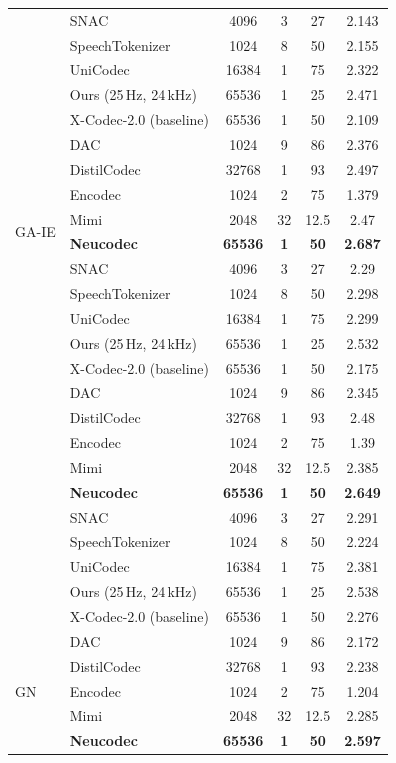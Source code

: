 \documentclass[preprint]{article}
\begin{document}
\begin{longtable}{llcccc}
  & SNAC & 4096 & 3 & 27 & 2.143 \\
  & SpeechTokenizer & 1024 & 8 & 50 & 2.155 \\
  & UniCodec & 16384 & 1 & 75 & 2.322 \\
  & Ours (25\,Hz, 24\,kHz) & 65536 & 1 & 25 & 2.471 \\
  & X-Codec-2.0 (baseline) & 65536 & 1 & 50 & 2.109 \\
\midrule
\multirow{8}{*}{GA-IE}
  & DAC & 1024 & 9 & 86 & 2.376 \\
  & DistilCodec & 32768 & 1 & 93 & 2.497 \\
  & Encodec & 1024 & 2 & 75 & 1.379 \\
  & Mimi & 2048 & 32 & 12.5 & 2.47 \\
  & \textbf{Neucodec} & \textbf{65536} & \textbf{1} & \textbf{50} & \textbf{2.687} \\
  & SNAC & 4096 & 3 & 27 & 2.29 \\
  & SpeechTokenizer & 1024 & 8 & 50 & 2.298 \\
  & UniCodec & 16384 & 1 & 75 & 2.299 \\
  & Ours (25\,Hz, 24\,kHz) & 65536 & 1 & 25 & 2.532 \\
  & X-Codec-2.0 (baseline) & 65536 & 1 & 50 & 2.175 \\
\newpage
\multirow{8}{*}{GL}
  & DAC & 1024 & 9 & 86 & 2.345 \\
  & DistilCodec & 32768 & 1 & 93 & 2.48 \\
  & Encodec & 1024 & 2 & 75 & 1.39 \\
  & Mimi & 2048 & 32 & 12.5 & 2.385 \\
  & \textbf{Neucodec} & \textbf{65536} & \textbf{1} & \textbf{50} & \textbf{2.649} \\
  & SNAC & 4096 & 3 & 27 & 2.291 \\
  & SpeechTokenizer & 1024 & 8 & 50 & 2.224 \\
  & UniCodec & 16384 & 1 & 75 & 2.381 \\
  & Ours (25\,Hz, 24\,kHz) & 65536 & 1 & 25 & 2.538 \\
  & X-Codec-2.0 (baseline) & 65536 & 1 & 50 & 2.276 \\
\midrule
\multirow{8}{*}{GN}
  & DAC & 1024 & 9 & 86 & 2.172 \\
  & DistilCodec & 32768 & 1 & 93 & 2.238 \\
  & Encodec & 1024 & 2 & 75 & 1.204 \\
  & Mimi & 2048 & 32 & 12.5 & 2.285 \\
  & \textbf{Neucodec} & \textbf{65536} & \textbf{1} & \textbf{50} & \textbf{2.597} \\

\end{longtable}
\end{document}
